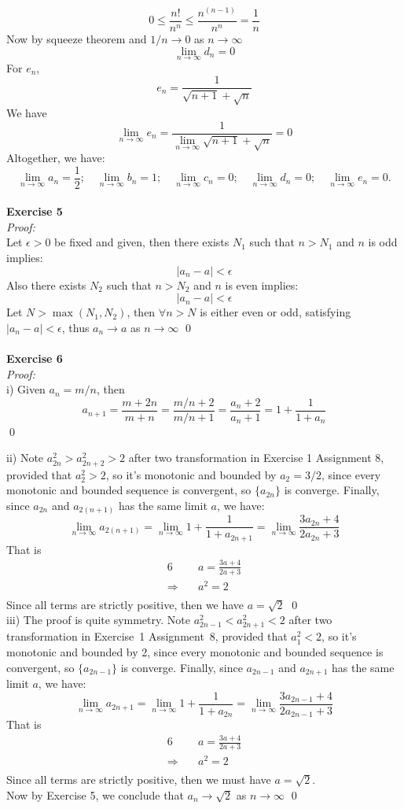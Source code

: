 \documentclass[12pt]{article}
\begin{document}
\[
0\leq\frac{n!}{n^n}\leq\frac{n^{(n-1)}}{n^n}=\frac{1}{n}
\]
Now by squeeze theorem and $1/n\to0$ as $n\to\infty$
\[
\lim_{n\to\infty}d_n=0
\]
For $e_n$,
\[
e_n=\frac{1}{\sqrt{n+1}+\sqrt{n}}
\]
We have
\[
\lim_{n\to\infty}e_n=
\frac{1}{\displaystyle\lim_{n\to\infty}\sqrt{n+1}+\sqrt{n}}=0
\]
Altogether, we have:
\[
\lim_{n\to\infty}a_n=\frac{1}{2};
\quad\lim_{n\to\infty}b_n=1;
\quad\lim_{n\to\infty}c_n=0;
\quad\lim_{n\to\infty}d_n=0;
\quad\lim_{n\to\infty}e_n=0.
\]
\\
\textbf{Exercise 5}\\
\textit{Proof: }\\
Let $\epsilon>0$ be fixed and given, 
then there exists $N_1$ such that $n>N_1$ and $n$ is odd implies:
\[
|a_n-a|<\epsilon
\]
Also there exists $N_2$ such that $n>N_2$ and $n$ is even implies:
\[
|a_n-a|<\epsilon
\]
Let $N>\max(N_1,N_2)$, 
then $\forall n>N$ is either even or odd,
satisfying $|a_n-a|<\epsilon$, thus $a_n\to a$ as $n\to \infty$
\qed
\\\
\\
\textbf{Exercise 6}\\
\textit{Proof: }\\i) Given $a_n=m/n$, then
\[
a_{n+1}=\frac{m+2n}{m+n}
=\frac{m/n+2}{m/n+1}
=\frac{a_n+2}{a_n+1}
=1+\frac{1}{1+a_n}
\]\qed

ii) Note $a_{2n}^2>a_{2n+2}^2>2$ 
after two transformation in Exercise 1 Assignment 8,
provided that $a_2^2>2$,
so it's monotonic and bounded by $a_2=3/2$,
since every monotonic and bounded sequence is convergent,
so $\{a_{2n}\}$ is converge. 
Finally, since $a_{2n}$ and $a_{2(n+1)}$ has the same limit $a$,
we have:
\[
\lim_{n\to \infty}a_{2(n+1)}=
\lim_{n\to\infty}1
+\frac{1}{1+a_{2n+1}}
=\lim_{n\to\infty}\frac{3a_{2n}+4}{2a_{2n}+3}
\]
That is
\begin{alignat*}{6}
&a=\frac{3a+4}{2a+3}\\
\Longrightarrow \quad&a^2=2\\
\end{alignat*}
Since all terms are strictly positive, then we have $a=\sqrt2$
\qed\\

iii) The proof is quite symmetry.
Note $a_{2n-1}^2<a_{2n+1}^2<2$
after two transformation in Exercise~1 Assignment~8,
provided that $a_1^2<2$,
so it's monotonic and bounded by 2,
since every monotonic and bounded sequence is convergent,
so $\{a_{2n-1}\}$ is converge. 
Finally, since $a_{2n-1}$ and $a_{2n+1}$ has the same limit $a$, we have:
\[
\lim_{n\to \infty}a_{2n+1}
=\lim_{n\to\infty}1+\frac{1}{1+a_{2n}}
=\lim_{n\to\infty}\frac{3a_{2n-1}+4}{2a_{2n-1}+3}
\]
That is
\begin{alignat*}{6}
&a=\frac{3a+4}{2a+3}\\
\Longrightarrow \quad&a^2=2\\
\end{alignat*}
Since all terms are strictly positive, then we must have $a=\sqrt2.$\\
Now by Exercise 5, we conclude that $a_n\to\sqrt 2$ as $n\to\infty$
\qed\\
\end{document}
